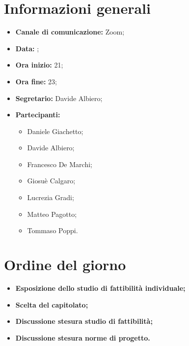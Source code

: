 \section{Informazioni generali}

\begin{itemize}

	\item \textbf{Canale di comunicazione:} Zoom;
	
	\item \textbf{Data:} \DataMeeting{};
	
	\item \textbf{Ora inizio:} 21;
	
	\item \textbf{Ora fine:} 23;
	
	\item \textbf{Segretario:} Davide Albiero;
	
	\item \textbf{Partecipanti:}
	
		\begin{itemize}
		
			\item Daniele Giachetto;
			\item Davide Albiero;
			\item Francesco De Marchi;
			\item Giosuè Calgaro;
			\item Lucrezia Gradi;
			\item Matteo Pagotto;
			\item Tommaso Poppi.
				 
		\end{itemize}

\end{itemize}

\section{Ordine del giorno}

\begin{itemize}

	\item\textbf{Esposizione dello studio di fattibilità individuale;}
	
	\item\textbf{Scelta del capitolato;}

	\item\textbf{Discussione stesura studio di fattibilità;}

	\item\textbf{Discussione stesura norme di progetto.}

\end{itemize}

